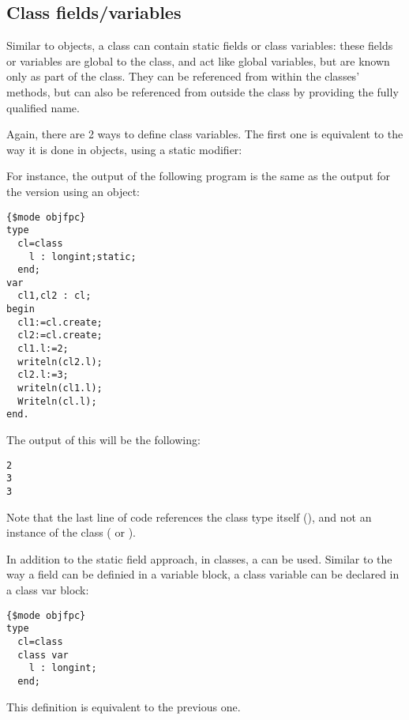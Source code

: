 \subsection{Class fields/variables}
Similar to objects, a class can contain static fields or class variables: 
these fields or variables are global to the class, and act like global 
variables, but are known only as part of the class. They can be referenced
 from within the classes' methods, but can also be 
referenced from outside the class by providing the fully qualified name.

Again, there are 2 ways to define class variables. The first one is equivalent 
to the way it is done in objects, using a static modifier:

For instance, the output of the following program is the same as the output for
the version using an object:
\begin{verbatim}
{$mode objfpc}
type
  cl=class
    l : longint;static;
  end;
var
  cl1,cl2 : cl;
begin
  cl1:=cl.create;
  cl2:=cl.create;
  cl1.l:=2;
  writeln(cl2.l);
  cl2.l:=3;
  writeln(cl1.l);
  Writeln(cl.l);
end.
\end{verbatim}
The output of this will be the following:
\begin{verbatim}
2
3
3
\end{verbatim}
Note that the last line of code references the class type itself (), 
and not an instance of the class ( or ).

In addition to the static field approach, in classes, a  can be used. 
Similar to the way a field can be definied in a variable block, a class variable can
be declared in a class var block:
\begin{verbatim}
{$mode objfpc}
type
  cl=class
  class var 
    l : longint;
  end;
\end{verbatim}
This definition is equivalent to the previous one.


